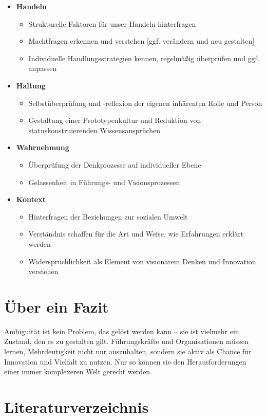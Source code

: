 \documentclass[
  ngerman,
  letterpaper,
  DIV=11]{scrartcl}
\providecommand{\tightlist}{%
  \setlength{\itemsep}{0pt}\setlength{\parskip}{0pt}}
\begin{document}
\begin{itemize}
\tightlist
\item
  \textbf{Handeln}

  \begin{itemize}
  \tightlist
  \item
    Strukturelle Faktoren für unser Handeln hinterfragen
  \item
    Machtfragen erkennen und verstehen {[}ggf. verändern und neu
    gestalten{]}
  \item
    Individuelle Handlungsstrategien kennen, regelmäßig überprüfen und
    ggf. anpassen
  \end{itemize}
\item
  \textbf{Haltung}

  \begin{itemize}
  \tightlist
  \item
    Selbstüberprüfung und -reflexion der eigenen inhärenten Rolle und
    Person
  \item
    Gestaltung einer Prototypenkultur und Reduktion von
    statuskonstruierenden Wissensansprüchen
  \end{itemize}
\item
  \textbf{Wahrnehmung}

  \begin{itemize}
  \tightlist
  \item
    Überprüfung der Denkprozesse auf individueller Ebene
  \item
    Gelassenheit in Führungs- und Visionsprozessen
  \end{itemize}
\item
  \textbf{Kontext}

  \begin{itemize}
  \tightlist
  \item
    Hinterfragen der Beziehungen zur sozialen Umwelt
  \item
    Verständnis schaffen für die Art und Weise, wie Erfahrungen erklärt
    werden
  \item
    Widersprüchlichkeit als Element von visionärem Denken und Innovation
    verstehen
  \end{itemize}
\end{itemize}

\section{Über ein Fazit}\label{uxfcber-ein-fazit}

Ambiguität ist kein Problem, das gelöst werden kann -- sie ist vielmehr
ein Zustand, den es zu gestalten gilt. Führungskräfte und Organisationen
müssen lernen, Mehrdeutigkeit nicht nur auszuhalten, sondern sie aktiv
als Chance für Innovation und Vielfalt zu nutzen. Nur so können sie den
Herausforderungen einer immer komplexeren Welt gerecht werden.

\section{Literaturverzeichnis}\label{literaturverzeichnis}

\printbibliography[heading=none]
\end{document}
